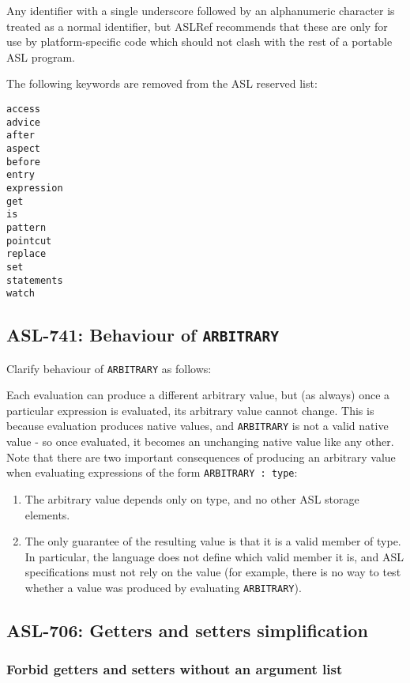 Any identifier with a single underscore followed by an alphanumeric
character is treated as a normal identifier, but ASLRef recommends that
these are only for use by platform-specific code which should not clash
with the rest of a portable ASL program.

The following keywords are removed from the ASL reserved list:
\begin{verbatim}
access
advice
after
aspect
before
entry
expression
get
is
pattern
pointcut
replace
set
statements
watch
\end{verbatim}

\subsection{ASL-741: Behaviour of \texttt{ARBITRARY}}

Clarify behaviour of \texttt{ARBITRARY} as follows:

Each evaluation can produce a different arbitrary value, but (as always)
once a particular expression is evaluated, its arbitrary value cannot
change. This is because evaluation produces native values, and
\texttt{ARBITRARY} is not a valid native value - so once evaluated, it
becomes an unchanging native value like any other.  Note that there are
two important consequences of producing an arbitrary value when
evaluating expressions of the form \texttt{ARBITRARY : type}:
\begin{enumerate}
\item The arbitrary value depends only on type, and no other ASL storage
elements.

\item The only guarantee of the resulting value is that it is a valid member of
type. In particular, the language does not define which valid member it
is, and ASL specifications must not rely on the value (for example, there
is no way to test whether a value was produced by evaluating
\texttt{ARBITRARY}).
\end{enumerate}

\subsection{ASL-706: Getters and setters simplification}

\subsubsection{Forbid getters and setters without an argument list}

